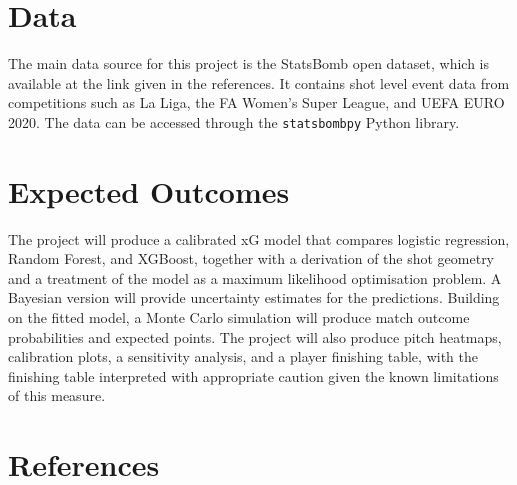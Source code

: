 \documentclass[11pt]{article}
\begin{document}
\section*{Data}

The main data source for this project is the StatsBomb open dataset, which is
available at the link given in the references. It contains shot level event data
from competitions such as La Liga, the FA Women's Super League, and UEFA EURO
2020. The data can be accessed through the \texttt{statsbombpy} Python library.

\section*{Expected Outcomes}

The project will produce a calibrated xG model that compares logistic
regression, Random Forest, and XGBoost, together with a derivation of the shot
geometry and a treatment of the model as a maximum likelihood optimisation
problem. A Bayesian version will provide uncertainty estimates for the
predictions. Building on the fitted model, a Monte Carlo simulation will produce
match outcome probabilities and expected points. The project will also produce
pitch heatmaps, calibration plots, a sensitivity analysis, and a player
finishing table, with the finishing table interpreted with appropriate caution
given the known limitations of this measure.

\section*{References}
\end{document}
